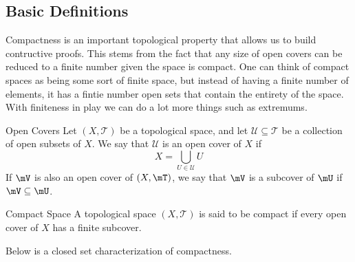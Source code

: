 \documentclass[a4paper]{article}
\begin{document}
\subsection{Basic Definitions}
Compactness is an important topological property that allows us to build contructive proofs. This stems from the fact that any size of open covers can be reduced to a finite number given the space is compact. One can think of compact spaces as being some sort of finite space, but instead of having a finite number of elements, it has a fintie number open sets that contain the entirety of the space. With finiteness in play we can do a lot more things such as extremums. 

\begin{defn}{Open Covers}{} Let $(X,\mathcal{T})$ be a topological space, and let $\mathcal{U}\subseteq\mathcal{T}$ be a collection of open subsets of $X$. We say that $\mathcal{U}$ is an open cover of $X$ if $$X=\bigcup_{U\in\mathcal{U}}U$$ If $\mV$ is also an open cover of $(X,\mT)$, we say that $\mV$ is a subcover of $\mU$ if $\mV\subseteq\mU$. 
\end{defn}

\begin{defn}{Compact Space}{} A topological space $(X,\mathcal{T})$ is said to be compact if every open cover of $X$ has a finite subcover. 
\end{defn}

Below is a closed set characterization of compactness. 
\end{document}
